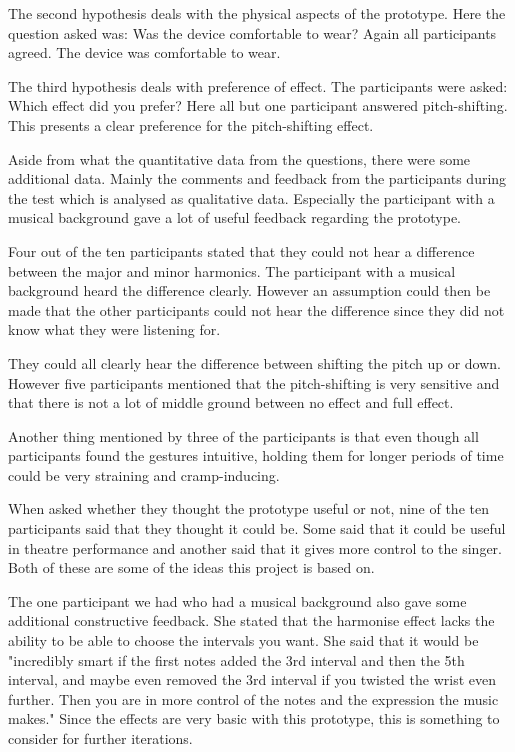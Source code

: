 The second hypothesis deals with the physical aspects of the prototype. Here the question asked was: Was the device comfortable to wear? Again all participants agreed. The device was comfortable to wear. 

The third hypothesis deals with preference of effect. The participants were asked: Which effect did you prefer? Here all but one participant answered pitch-shifting. This presents a clear preference for the pitch-shifting effect. 

Aside from what the quantitative data from the questions, there were some additional data. Mainly the comments and feedback from the participants during the test which is analysed as qualitative data. Especially the participant with a musical background gave a lot of useful feedback regarding the prototype. 

Four out of the ten participants stated that they could not hear a difference between the major and minor harmonics. The participant with a musical background heard the difference clearly. However an assumption could then be made that the other participants could not hear the difference since they did not know what they were listening for. 

They could all clearly hear the difference between shifting the pitch up or down. However five participants mentioned that the pitch-shifting is very sensitive and that there is not a lot of middle ground between no effect and full effect. 

Another thing mentioned by three of the participants is that even though all participants found the gestures intuitive, holding them for longer periods of time could be very straining and cramp-inducing. 

When asked whether they thought the prototype useful or not, nine of the ten participants said that they thought it could be. Some said that it could be useful in theatre performance and another said that it gives more control to the singer. Both of these are some of the ideas this project is based on. 

The one participant we had who had a musical background also gave some additional constructive feedback. She stated that the harmonise effect lacks the ability to be able to choose the intervals you want. She said that it would be "incredibly smart if the first notes added the 3rd interval and then the 5th interval, and maybe even removed the 3rd interval if you twisted the wrist even further. Then you are in more control of the notes and the expression the music makes." Since the effects are very basic with this prototype, this is something to consider for further iterations. 

